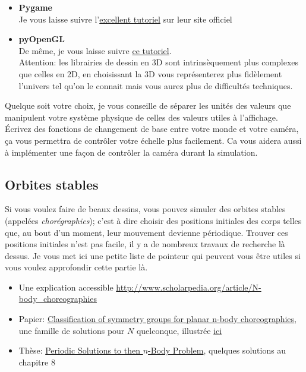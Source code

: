 \documentclass{article}
\begin{document}
\begin{itemize}
    \item \textbf{Pygame}\\
    Je vous laisse suivre l'\href{https://www.pygame.org/docs/}{excellent tutoriel} sur leur site officiel
    \item \textbf{pyOpenGL}\\
    De même, je vous laisse suivre \href{http://pyopengl.sourceforge.net/context/tutorials/index.html}{ce tutoriel}.\\
    Attention: les librairies de dessin en 3D sont intrinsèquement plus complexes que celles en 2D, en choisissant la 3D vous représenterez plus fidèlement l'univers tel qu'on le connait mais vous aurez plus de difficultés techniques.
\end{itemize}

Quelque soit votre choix, je vous conseille de séparer les unités des valeurs que manipulent votre système physique de celles des valeurs utiles à l'affichage. Écrivez des fonctions de changement de base entre votre monde et votre caméra, ça vous permettra de contrôler votre échelle plus facilement. Ca vous aidera aussi à implémenter une façon de contrôler la caméra durant la simulation.

\subsection{Orbites stables}
\label{solstables}

Si vous voulez faire de beaux dessins, vous pouvez simuler des orbites stables (appelées \emph{chorégraphies}); c'est à dire choisir des positions initiales des corps telles que, au bout d'un moment, leur mouvement devienne périodique. Trouver ces positions initiales n'est pas facile, il y a de nombreux travaux de recherche là dessus. Je vous met ici une petite liste de pointeur qui peuvent vous être utiles si vous voulez approfondir cette partie là.

\begin{itemize}
    \item Une explication accessible \url{http://www.scholarpedia.org/article/N-body_choreographies}
    \item Papier: \href{http://eprints.maths.manchester.ac.uk/2063/1/choreographies.pdf}{Classification of symmetry groups for planar n-body choreographies}, une famille de solutions pour $N$ quelconque, illustrée \href{http://rectangleworld.com/demos/nBody/}{ici}
    \item Thèse: \href{http://www.combinatorialmath.ca/Students/DyckThesis.pdf}{Periodic Solutions to then $n$-Body Problem}, quelques solutions au chapitre 8
\end{itemize}
\end{document}
